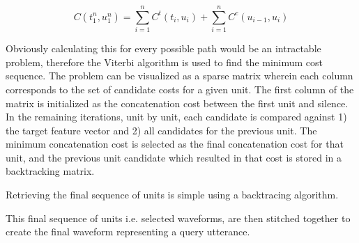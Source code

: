 \documentclass[10pt, journal, compsoc]{IEEEtran}
\begin{document}
\begin{equation}C(t_1^n,u_1^n)=\sum_{i=1}^nC^t(t_i,u_i)+ \sum_{i=1}^nC^c(u_{i-1},u_i)
\end{equation}\cite{Hunt:1996:USC:1256383.1256532}\par
Obviously calculating this for every possible path would be an intractable problem, therefore the Viterbi algorithm is used to find the minimum cost sequence. The problem can be visualized as a sparse matrix wherein each column corresponds to the set of candidate costs for a given unit. The first column of the matrix is initialized as the concatenation cost between the first unit and silence. In the remaining iterations, unit by unit, each candidate is compared against 1) the target feature vector and 2) all candidates for the previous unit. The minimum concatenation cost is selected as the final concatenation cost for that unit, and the previous unit candidate which resulted in that cost  is stored in a backtracking matrix.\par
\begin{algorithm}
\begin{algorithmic}[1]
\EndFor
{}
     \EndFor
\EndFor
{}
\EndFunction
\end{algorithmic}
\end{algorithm}
Retrieving the final sequence of units is simple using a backtracing algorithm.\par
\begin{algorithm}
\begin{algorithmic}[1]
\EndFor
{}
\EndFunction
\end{algorithmic}
\end{algorithm}
This final sequence of units i.e. selected waveforms, are then stitched together to create the final waveform representing a query utterance.
\end{document}

